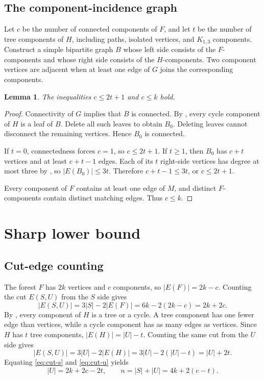\documentclass[smallextended,natbib,nospthms]{svjour3}
\newtheorem{lemma}[lemma]{Lemma}
\theoremstyle{definition}
\theoremstyle{remark}
\begin{document}
\subsection{The component-incidence graph}

Let $c$ be the number of connected components of $F$, and let $t$ be the number
of tree components of $H$, including paths, isolated vertices, and
$K_{1,3}$ components. Construct a simple bipartite graph $B$ whose left side
consists of the $F$-components and whose right side consists of the
$H$-components. Two component vertices are adjacent when at least one edge
of $G$ joins the corresponding components.

\begin{lemma}
\label{lem:incidence-bound}
The inequalities $c\leq 2t+1$ and $c\leq k$ hold.
\end{lemma}

\begin{proof}
Connectivity of $G$ implies that $B$ is connected. By
, every cycle component of $H$ is a leaf of $B$.
Delete all such leaves to obtain $B_0$. Deleting leaves cannot disconnect the
remaining vertices. Hence $B_0$ is connected.

If $t=0$, connectedness forces $c=1$, so $c\leq 2t+1$. If $t\geq 1$, then
$B_0$ has $c+t$ vertices and at least $c+t-1$ edges. Each of its $t$
right-side vertices has degree at most three by
, so $|E(B_0)|\leq 3t$. Therefore
$c+t-1\leq 3t$, or $c\leq 2t+1$.

Every component of $F$ contains at least one edge of $M$, and distinct
$F$-components contain distinct matching edges. Thus $c\leq k$.
\end{proof}

\section{Sharp lower bound}
\label{sec:bound}

\subsection{Cut-edge counting}

The forest $F$ has $2k$ vertices and $c$ components, so
$|E(F)|=2k-c$. Counting the cut $E(S,U)$ from the $S$ side gives
\begin{equation}
  |E(S,U)|
  =3|S|-2|E(F)|
  =6k-2(2k-c)
  =2k+2c.
  \label{eq:cut-s}
\end{equation}
By , every component of $H$ is a tree or a cycle. A
tree component has one fewer edge than vertices, while a cycle component has
as many edges as vertices. Since $H$ has $t$ tree components,
$|E(H)|=|U|-t$. Counting the same cut from the $U$ side gives
\begin{equation}
  |E(S,U)|
  =3|U|-2|E(H)|
  =3|U|-2(|U|-t)
  =|U|+2t.
  \label{eq:cut-u}
\end{equation}
Equating \eqref{eq:cut-s} and \eqref{eq:cut-u} yields
\begin{equation}
  |U|=2k+2c-2t,
  \qquad
  n=|S|+|U|=4k+2(c-t).
  \label{eq:master-count}
\end{equation}
\end{document}
